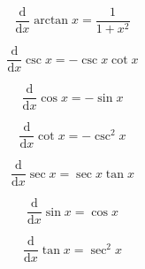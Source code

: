 \[\begin{equation} \frac{\mathrm{d}}{\mathrm{d} x} \arctan x = \frac{1}{1+x^2} \end{equation}\]

\[\begin{equation} \frac{\mathrm{d}}{\mathrm{d} x} \csc x = -\csc x \cot x \end{equation}\]

\[\begin{equation} \frac{\mathrm{d}}{\mathrm{d} x} \cos x = - \sin x \end{equation}\]

\[\begin{equation} \frac{\mathrm{d}}{\mathrm{d} x} \cot x = - \csc^2 x \end{equation}\]

\[\begin{equation} \frac{\mathrm{d}}{\mathrm{d} x} \sec x = \sec x \tan x \end{equation}\]

\[\begin{equation} \frac{\mathrm{d}}{\mathrm{d} x} \sin x = \cos x \end{equation}\]

\[\begin{equation} \frac{\mathrm{d}}{\mathrm{d} x} \tan x = \sec ^2 x \end{equation}\]
